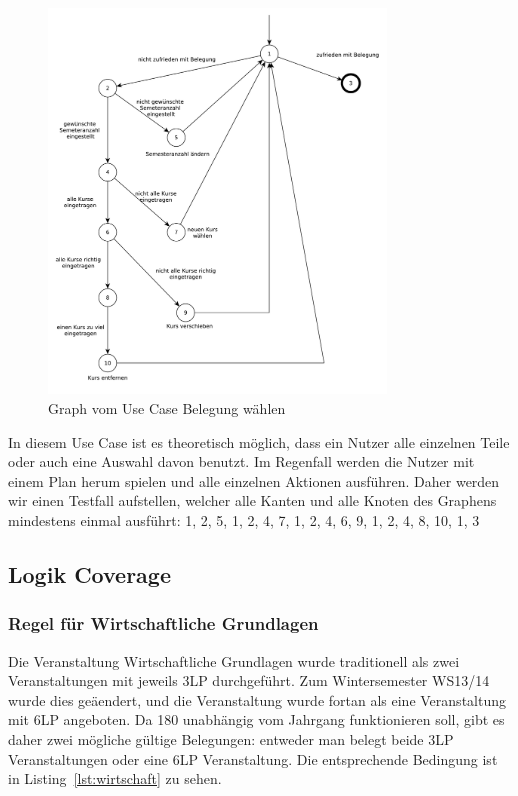 \documentclass[ngerman]{article}
\begin{document}
\begin{figure}[h!]
\includegraphics[width=0.8\textwidth]{figures/belegung_waehlen_use_case.pdf}
\caption{Graph vom Use Case Belegung wählen}
\label{fig:graph_belegung_waehlen}
\end{figure}

In diesem Use Case ist es theoretisch möglich, dass ein Nutzer alle einzelnen Teile oder auch eine Auswahl davon benutzt. Im Regenfall werden die Nutzer mit einem Plan herum spielen und alle einzelnen Aktionen ausführen.
Daher werden wir einen Testfall aufstellen, welcher alle Kanten und alle Knoten des Graphens mindestens einmal ausführt: 1, 2, 5, 1, 2, 4, 7, 1, 2, 4, 6, 9, 1, 2, 4, 8, 10, 1, 3


\subsection{Logik Coverage}

\subsubsection{Regel für Wirtschaftliche Grundlagen}

Die Veranstaltung Wirtschaftliche Grundlagen wurde traditionell als zwei Veranstaltungen mit jeweils 3LP durchgeführt.
Zum Wintersemester WS13/14 wurde dies geäendert, und die Veranstaltung wurde fortan als eine Veranstaltung mit 6LP angeboten.
Da 180 unabhängig vom Jahrgang funktionieren soll, gibt es daher zwei mögliche gültige Belegungen: entweder man belegt beide 3LP Veranstaltungen oder eine 6LP Veranstaltung.
Die entsprechende Bedingung ist in Listing~\ref{lst:wirtschaft} zu sehen.
\end{document}
